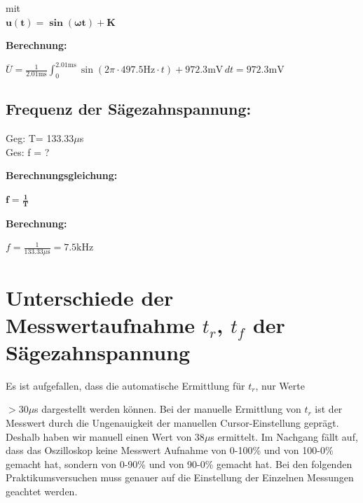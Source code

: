 \documentclass[12pt, a4paper, titlepage]{article}
\begin{document}
\noindent
mit \\

\noindent
$\bm{\displaystyle u(t) = \sin(\omega t) +K}$

\vspace{1cm}

\noindent
\textbf{Berechnung:}

\vspace{0.75cm}

\noindent
$\displaystyle \overline{U} = \frac{1}{2.01\text{ms}} \int_{0}^{2.01\text{ms}} \sin \left(2 \pi \cdot  497.5\text{Hz} \cdot  t \right) + 972.3\text{mV}  \, dt = 972.3\text{mV} $

\newpage

\subsection*{Frequenz der Sägezahnspannung:}

\vspace{0.75cm}

Geg: T= 133.33$\mu$s \\

\noindent
Ges: f = ?

\vspace{1cm}

\noindent
\textbf{Berechnungsgleichung:}

\vspace{0.75cm}

\noindent
$\bm{\displaystyle f = \frac{1}{T}} $\\


\vspace{1cm}

\noindent
\textbf{Berechnung:}

\vspace{0.75cm}

\noindent
$\displaystyle f = \frac{1}{133.33\mu\text{s}}  = 7.5\text{kHz} $

\newpage

\section{Unterschiede der Messwertaufnahme $t_{r}$, $t_{f}$ der Sägezahnspannung}

\vspace{1cm}

\noindent
Es ist aufgefallen, dass die automatische Ermittlung für $t_{r}$, nur Werte

\noindent
$>30\mu$s dargestellt werden können.
Bei der manuelle Ermittlung von $t_{r}$ ist der Messwert durch die Ungenauigkeit der manuellen Cursor-Einstellung geprägt.
Deshalb haben wir manuell einen Wert von 38$\mu$s ermittelt.
Im Nachgang fällt auf, dass das Oszilloskop keine Messwert Aufnahme von 0-100\% und von 100-0\% gemacht hat,
sondern von 0-90\% und von 90-0\% gemacht hat.
Bei den folgenden Praktikumsversuchen muss genauer auf die Einstellung der Einzelnen Messungen geachtet werden.
\end{document}
